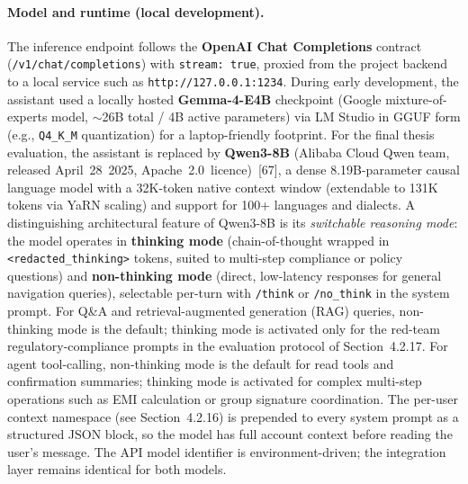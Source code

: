 \documentclass[12pt,a4paper]{article}
\begin{document}
\paragraph{Model and runtime (local development).}
The inference endpoint follows the \textbf{OpenAI Chat Completions} contract (\texttt{/v1/chat/completions}) with \texttt{stream: true}, proxied from the project backend to a local service such as \texttt{http://127.0.0.1:1234}. During early development, the assistant used a locally hosted \textbf{Gemma-4-E4B} checkpoint (Google mixture-of-experts model, $\sim$26B total / 4B active parameters) via LM Studio in GGUF form (e.g., \texttt{Q4\_K\_M} quantization) for a laptop-friendly footprint. For the final thesis evaluation, the assistant is replaced by \textbf{Qwen3-8B} (Alibaba Cloud Qwen team, released April~28~2025, Apache~2.0~licence)~[67], a dense 8.19B-parameter causal language model with a 32K-token native context window (extendable to 131K tokens via YaRN scaling) and support for 100+ languages and dialects. A distinguishing architectural feature of Qwen3-8B is its \emph{switchable reasoning mode}: the model operates in \textbf{thinking mode} (chain-of-thought wrapped in \texttt{<redacted\_thinking>} tokens, suited to multi-step compliance or policy questions) and \textbf{non-thinking mode} (direct, low-latency responses for general navigation queries), selectable per-turn with \texttt{/think} or \texttt{/no\_think} in the system prompt. For Q\&A and retrieval-augmented generation (RAG) queries, non-thinking mode is the default; thinking mode is activated only for the red-team regulatory-compliance prompts in the evaluation protocol of Section~4.2.17. For agent tool-calling, non-thinking mode is the default for read tools and confirmation summaries; thinking mode is activated for complex multi-step operations such as EMI calculation or group signature coordination. The per-user context namespace (see Section~4.2.16) is prepended to every system prompt as a structured JSON block, so the model has full account context before reading the user's message. The API model identifier is environment-driven; the integration layer remains identical for both models.
\end{document}
